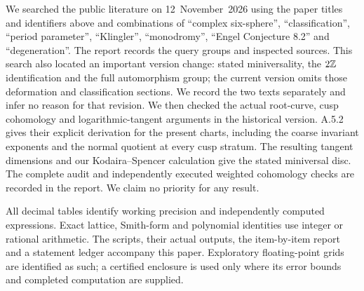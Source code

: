 We searched the public literature on 12~November~2026 using the
paper titles and identifiers above and combinations of
``complex six-sphere'', ``classification'', ``period parameter'',
``Klingler'', ``monodromy'', ``Engel Conjecture 8.2'' and
``degeneration''. The report records the query groups and inspected
sources. This search also located an important version change:
\cite[Theorems~1.3--1.4]{DGKX26v1} stated miniversality, the
$2\mathbb Z$ identification and the full automorphism group; the current
version \cite{DGKX26v2} omits those deformation and classification
sections. We record the two texts separately and infer no reason
for that revision. We then checked the actual root-curve, cusp
cohomology and logarithmic-tangent arguments in the historical
version. A.5.2 gives their explicit derivation for the present
charts, including the coarse invariant exponents and the normal
quotient at every cusp stratum. The resulting tangent dimensions
and our Kodaira--Spencer calculation give the stated miniversal
disc. The complete audit and independently executed weighted
cohomology checks are recorded in the report. We claim no priority
for any result.

All decimal tables identify working precision and independently
computed expressions. Exact lattice, Smith-form and polynomial
identities use integer or rational arithmetic. The scripts,
their actual outputs, the item-by-item report and a statement
ledger accompany this paper. Exploratory floating-point grids
are identified as such; a certified enclosure is used only
where its error bounds and completed computation are supplied.
